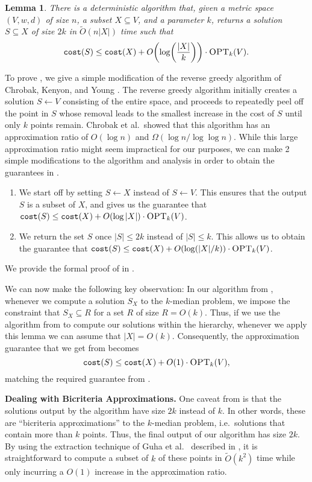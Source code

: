 \documentclass[11pt]{article}
\newcommand{\1}{\mathmybb{1}}
\newtheorem{lemma}[theorem]{Lemma}
\newcommand{\OPT}{\textsc{OPT}}
\newcommand{\cost}{\textnormal{\texttt{cost}}}
\begin{document}
\begin{lemma}\label{thm:rest:intro}
    There is a deterministic algorithm that, given a metric space $(V,w,d)$ of size $n$, a subset $X \subseteq V$, and a parameter $k$, returns a solution $S \subseteq X$ of size $2k$ in $\tilde O(n |X|)$ time such that
    $$ \cost(S) \leq \cost(X) + O \!\left( \log \! \left(\frac{|X|}{k} \right)\right) \cdot \OPT_k(V). $$
\end{lemma}

To prove , we give a simple modification of the reverse greedy algorithm of Chrobak, Kenyon, and Young \cite{ChrobakKY06}. The reverse greedy algorithm initially creates a solution $S \leftarrow V$ consisting of the entire space, and proceeds to repeatedly peel off the point in $S$ whose removal leads to the smallest increase in the cost of $S$ until only $k$ points remain. Chrobak et al.~showed that this algorithm has an approximation ratio of $O(\log n)$ and $\Omega(\log n / \log \log n)$.
While this large approximation ratio might seem impractical for our purposes, we can make 2 simple modifications to the algorithm and analysis in order to obtain the guarantees in .
\begin{enumerate}
    \item We start off by setting $S \leftarrow X$ instead of $S \leftarrow V$. This ensures that the output $S$ is a subset of $X$, and gives us the guarantee that $\cost(S) \leq \cost(X) + O(\log |X|) \cdot \OPT_k(V)$.
    \item We return the set $S$ once $|S| \leq 2k$ instead of $|S| \leq k$. This allows us to obtain the guarantee that $\cost(S) \leq \cost(X) + O(\log (|X|/k)) \cdot \OPT_k(V)$.
\end{enumerate}
We provide the formal proof of  in .

We can now make the following key observation: In our algorithm from , whenever we compute a solution $S_X$ to the $k$-median problem, we impose the constraint that $S_X \subseteq R$ for a set $R$ of size $R = O(k)$. Thus, if we use the algorithm from  to compute our solutions within the hierarchy, whenever we apply this lemma we can assume that $|X| = O(k)$. Consequently, the approximation guarantee that we get from  becomes
$$ \cost(S) \leq \cost(X) + O(1) \cdot \OPT_k(V), $$
matching the required guarantee from .

\medskip
\noindent \textbf{Dealing with Bicriteria Approximations.} One caveat from  is that the solutions output by the algorithm have size $2k$ instead of $k$. In other words, these are ``bicriteria approximations'' to the $k$-median problem, i.e.~solutions that contain more than $k$ points. Thus, the final output of our algorithm has size $2k$. By using the extraction technique of Guha et al.~\cite{focs/GuhaMMO00} described in , it is straightforward to compute a subset of $k$ of these points in $\tilde O(k^2)$ time while only incurring a $O(1)$ increase in the approximation ratio.
\end{document}
